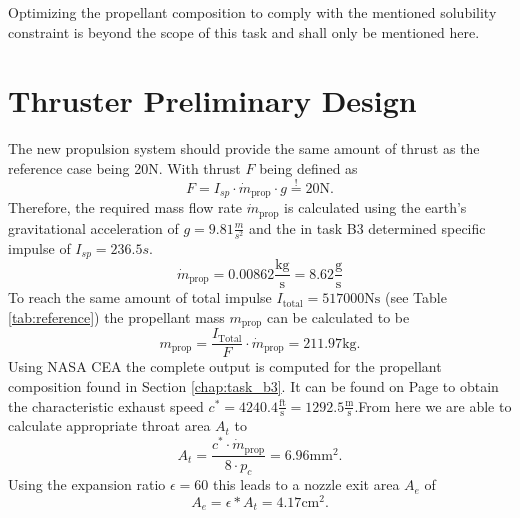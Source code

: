 \documentclass[12pt]{article}
\begin{document}
Optimizing the propellant composition to comply with the mentioned solubility constraint is beyond the scope of this task and shall only be mentioned here.

\section{Thruster Preliminary Design}
\label{chap:task_b4}
The new propulsion system should provide the same amount of thrust as the reference case being 20N. With thrust $F$ being defined as
\begin{equation}
	F = I_{sp} \cdot \dot{m}_{\text{prop}} \cdot g \overset{!}{=} 20\text{N}.
	\label{eq:thrust}
\end{equation}
Therefore, the required mass flow rate $\dot{m}_{\text{prop}}$ is calculated using the earth's gravitational acceleration of $g=9.81\frac{m}{s^2}$ and the in task B3 determined specific impulse of $I_{sp}=236.5s$.
\begin{equation*}
	\dot{m}_{\text{prop}} = 0.00862 \frac{\text{kg}}{\text{s}} = 8.62 \frac{\text{g}}{\text{s}}
\end{equation*}
To reach the same amount of total impulse $I_{\text{total}}=517000\text{Ns}$ (see Table \ref{tab:reference}) the propellant mass $m_{\text{prop}}$ can be calculated to be
\begin{equation*}
	m_{\text{prop}} = \frac{I_{\text{Total}}}{F} \cdot \dot{m}_{\text{prop}} =  211.97\text{kg}.
\end{equation*}
Using NASA CEA the complete output is computed for the propellant composition found in Section \ref{chap:task_b3}. It can be found on Page \pageref{chap:cea_output} to obtain the characteristic exhaust speed $c^*=4240.4\frac{\text{ft}}{\text{s}}=1292.5\frac{\text{m}}{\text{s}}$.From here we are able to calculate appropriate throat area $A_t$ to
\begin{equation}
	A_t = \frac{c^* \cdot \dot{m}_{\text{prop}}}{8 \cdot p_c} = 6.96 \text{mm}^2.
	\label{eq:throat_ares}
\end{equation}
Using the expansion ratio $\epsilon=60$ this leads to a nozzle exit area $A_e$ of
\begin{equation*}
A_e = \epsilon * A_t = 4.17 \text{cm}^2.
\end{equation*}

\end{document}
